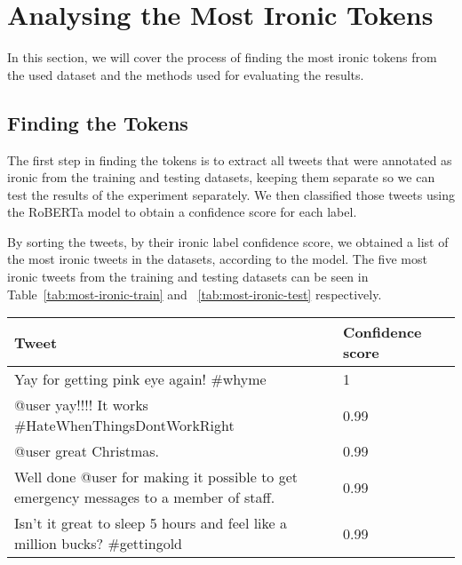 \documentclass[10pt, a4paper]{article}
\begin{document}
\section{Analysing the Most Ironic Tokens}

In this section, we will cover the process of finding the most ironic tokens from the used dataset and the methods used for evaluating the results.

\subsection{Finding the Tokens}

The first step in finding the tokens is to extract all tweets that were annotated as ironic from the training and testing datasets, keeping them separate so we can test the results of the experiment separately.
We then classified those tweets using the RoBERTa model to obtain a confidence score for each label.

By sorting the tweets, by their ironic label confidence score, we obtained a list of the most ironic tweets in the datasets, according to the model.
The five most ironic tweets from the training and testing datasets can be seen in Table~\ref{tab:most-ironic-train} and ~\ref{tab:most-ironic-test} respectively.

\begin{table*}
\caption{Most Ironic Tweets in the Training Set}
\label{tab:most-ironic-train}
\begin{center}
\begin{tabular}{llr}
\toprule
Tweet & Confidence score\\
\midrule
Yay for getting pink eye again!  \#whyme                                                & 1 \\
@user yay!!!! It works  \#HateWhenThingsDontWorkRight                                   & 0.99 \\
@user great Christmas.                                                                  & 0.99 \\
Well done @user for making it possible to get emergency messages to a member of staff.  & 0.99 \\
Isn't it great to sleep 5 hours and feel like a million bucks?  \#gettingold            & 0.99 \\
\bottomrule
\end{tabular}
\end{center}
\end{table*}
\end{document}
